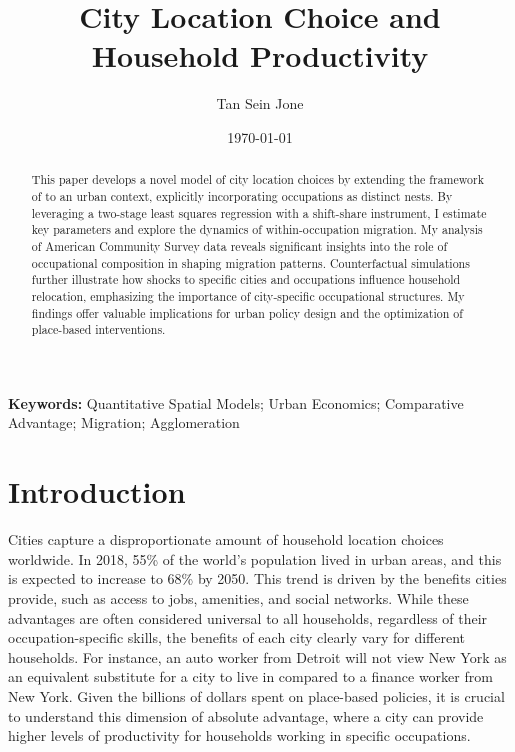 \documentclass[10pt]{article}
\title{City Location Choice and Household Productivity}
\author{Tan Sein Jone}
\date{\today}
\begin{document}
\doublespacing
\maketitle

\vfill

\begin{abstract}
    This paper develops a novel model of city location choices by extending the framework of \cite{lindandramondo} to an urban context, explicitly incorporating occupations as distinct nests. By leveraging a two-stage least squares regression with a shift-share instrument, I estimate key parameters and explore the dynamics of within-occupation migration. My analysis of American Community Survey data reveals significant insights into the role of occupational composition in shaping migration patterns. Counterfactual simulations further illustrate how shocks to specific cities and occupations influence household relocation, emphasizing the importance of city-specific occupational structures. My findings offer valuable implications for urban policy design and the optimization of place-based interventions.
\end{abstract}

\vfill

\noindent\textbf{Keywords:} Quantitative Spatial Models; Urban Economics; Comparative Advantage; Migration; Agglomeration

\vfill

\newpage

\section{Introduction}

Cities capture a disproportionate amount of household location choices worldwide. In 2018, 55\% of the world's population lived in urban areas, and this is expected to increase to 68\% by 2050. This trend is driven by the benefits cities provide, such as access to jobs, amenities, and social networks. While these advantages are often considered universal to all households, regardless of their occupation-specific skills, the benefits of each city clearly vary for different households. For instance, an auto worker from Detroit will not view New York as an equivalent substitute for a city to live in compared to a finance worker from New York. Given the billions of dollars spent on place-based policies, it is crucial to understand this dimension of absolute advantage, where a city can provide higher levels of productivity for households working in specific occupations.
\end{document}

